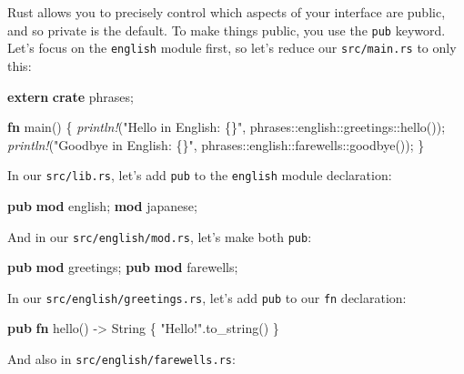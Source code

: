 \documentclass[a4paper,]{book}
\newenvironment{Shaded}{\begin{snugshade}}{\end{snugshade}}
\newcommand{\KeywordTok}[1]{\textcolor[rgb]{0.13,0.29,0.53}{\textbf{{#1}}}}
\newcommand{\DataTypeTok}[1]{\textcolor[rgb]{0.13,0.29,0.53}{{#1}}}
\newcommand{\StringTok}[1]{\textcolor[rgb]{0.31,0.60,0.02}{{#1}}}
\newcommand{\PreprocessorTok}[1]{\textcolor[rgb]{0.56,0.35,0.01}{\textit{{#1}}}}
\newcommand{\NormalTok}[1]{{#1}}
\begin{document}
Rust allows you to precisely control which aspects of your interface are
public, and so private is the default. To make things public, you use
the \texttt{pub} keyword. Let's focus on the \texttt{english} module
first, so let's reduce our \texttt{src/main.rs} to only this:

\begin{Shaded}
\begin{Highlighting}[]
\KeywordTok{extern} \KeywordTok{crate} \NormalTok{phrases;}

\KeywordTok{fn} \NormalTok{main() \{}
    \PreprocessorTok{println!}\NormalTok{(}\StringTok{"Hello in English: \{\}"}\NormalTok{, phrases::english::greetings::hello());}
    \PreprocessorTok{println!}\NormalTok{(}\StringTok{"Goodbye in English: \{\}"}\NormalTok{, phrases::english::farewells::goodbye());}
\NormalTok{\}}
\end{Highlighting}
\end{Shaded}

In our \texttt{src/lib.rs}, let's add \texttt{pub} to the
\texttt{english} module declaration:

\begin{Shaded}
\begin{Highlighting}[]
\KeywordTok{pub} \KeywordTok{mod} \NormalTok{english;}
\KeywordTok{mod} \NormalTok{japanese;}
\end{Highlighting}
\end{Shaded}

And in our \texttt{src/english/mod.rs}, let's make both \texttt{pub}:

\begin{Shaded}
\begin{Highlighting}[]
\KeywordTok{pub} \KeywordTok{mod} \NormalTok{greetings;}
\KeywordTok{pub} \KeywordTok{mod} \NormalTok{farewells;}
\end{Highlighting}
\end{Shaded}

In our \texttt{src/english/greetings.rs}, let's add \texttt{pub} to our
\texttt{fn} declaration:

\begin{Shaded}
\begin{Highlighting}[]
\KeywordTok{pub} \KeywordTok{fn} \NormalTok{hello() -> }\DataTypeTok{String} \NormalTok{\{}
    \StringTok{"Hello!"}\NormalTok{.to_string()}
\NormalTok{\}}
\end{Highlighting}
\end{Shaded}

And also in \texttt{src/english/farewells.rs}:
\end{document}
